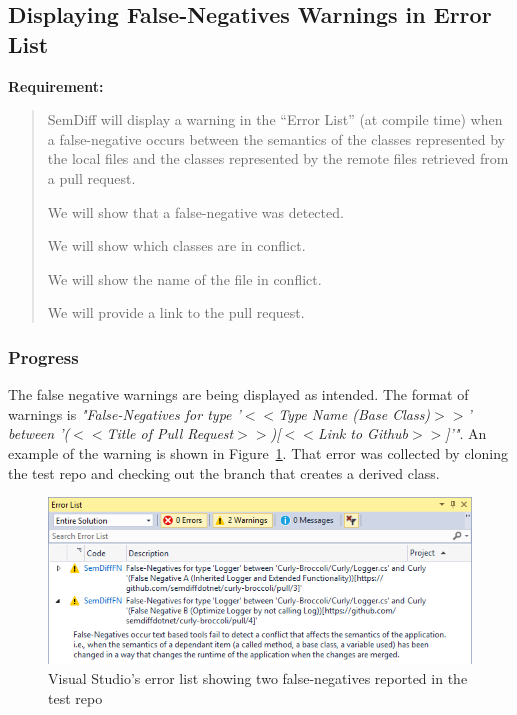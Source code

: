 \documentclass[draftclsnofoot,onecolumn]{IEEEtran}
\begin{document}
\subsection{Displaying False-Negatives Warnings in Error List}%

\textbf{Requirement:}

\begin{quote}

SemDiff will display a warning in the “Error List” (at compile time) when a 
false-negative occurs between the semantics of the classes represented by the 
local files and the classes represented by the remote files retrieved from a 
pull request.

We will show that a false-negative was detected.

We will show which classes are in conflict.

We will show the name of the file in conflict.

We will provide a link to the pull request.

\end{quote}

\subsubsection{Progress}

The false negative warnings are being displayed as intended. The format of 
warnings is \textit{"False-Negatives for type '$<<$Type Name (Base 
Class)$>>$' between '($<<$Title of Pull Request$>>$)[$<<$Link to 
Github$>>$]'"}. An example of the warning is shown in Figure~\ref{fnerrorlist}. 
That error was collected by cloning the test repo and checking out the branch 
that creates a derived class.

\begin{figure}[!htb]
\centering
\includegraphics[scale=1]{FalseNegativeErrorList}
\caption{Visual Studio’s error list showing two false-negatives reported in 
the test repo}
\label{fnerrorlist}
\end{figure}
\end{document}
